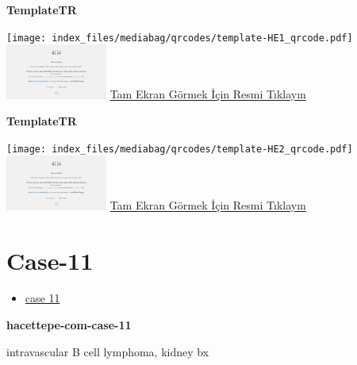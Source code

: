 \documentclass[
  letterpaper,
  DIV=11,
  numbers=noendperiod]{scrreprt}
\providecommand{\tightlist}{%
  \setlength{\itemsep}{0pt}\setlength{\parskip}{0pt}}\usepackage{longtable,booktabs,array}
\begin{document}
\textbf{TemplateTR}

\texttt{[image: index\_files/mediabag/qrcodes/template-HE1\_qrcode.pdf]}
\href{https://images.patolojiatlasi.com/template/HE1.html}{\includegraphics[width=0.25\textwidth,height=\textheight]{./screenshots/thumbnail_template-HE1.png}}
\href{https://images.patolojiatlasi.com/template/HE1.html}{Tam Ekran
Görmek İçin Resmi Tıklayın}

\textbf{TemplateTR}

\texttt{[image: index\_files/mediabag/qrcodes/template-HE2\_qrcode.pdf]}
\href{https://images.patolojiatlasi.com/template/HE2.html}{\includegraphics[width=0.25\textwidth,height=\textheight]{./screenshots/thumbnail_template-HE2.png}}
\href{https://images.patolojiatlasi.com/template/HE2.html}{Tam Ekran
Görmek İçin Resmi Tıklayın}

\hypertarget{sec-hacettepe-case-of-the-month-case-11}{%
\section{Case-11}\label{sec-hacettepe-case-of-the-month-case-11}}

\begin{itemize}
\tightlist
\item
  \href{https://www.youtube.com/watch?v=A5XO1Kp11Zk&ab_channel=KemalKosemehmetoglu}{case
  11}
\end{itemize}

\textbf{hacettepe-com-case-11}

\begin{tcolorbox}[enhanced jigsaw, breakable, opacitybacktitle=0.6, arc=.35mm, colbacktitle=quarto-callout-tip-color!10!white, colback=white, toptitle=1mm, left=2mm, opacityback=0, colframe=quarto-callout-tip-color-frame, titlerule=0mm, rightrule=.15mm, bottomrule=.15mm, toprule=.15mm, bottomtitle=1mm, title=\textcolor{quarto-callout-tip-color}{\faLightbulb}\hspace{0.5em}{Tanı}, coltitle=black, leftrule=.75mm]

intravascular B cell lymphoma, kidney bx

\end{tcolorbox}
\end{document}
